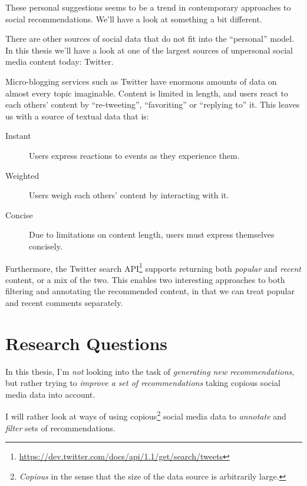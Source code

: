 These personal suggestions seems to be a trend in contemporary approaches to social recommendations.
We'll have a look at something a bit different.


There are other sources of social data that do not fit into the ``personal'' model.
In this thesis we'll have a look at one of the largest sources of unpersonal social media content today: Twitter.

Micro-blogging services such as Twitter have enormous amounts of data on almost every topic imaginable.
Content is limited in length, and users react to each others' content by ``re-tweeting'', ``favoriting'' or ``replying to'' it.
This leaves us with a source of textual data that is:

\begin{description}
  \item[Instant] Users express reactions to events as they experience them.
  \item[Weighted] Users weigh each others' content by interacting with it.
  \item[Concise] Due to limitations on content length, users must express themselves concisely.
\end{description}

Furthermore, the Twitter search API\footnote{\url{https://dev.twitter.com/docs/api/1.1/get/search/tweets}} supports returning both \emph{popular} and \emph{recent} content, or a mix of the two.
This enables two interesting approaches to both filtering and annotating the recommended content, in that we can treat popular and recent comments separately.


\section{Research Questions}

In this thesis, I'm \emph{not} looking into the task of \emph{generating new recommendations}, but rather trying to \emph{improve a set of recommendations} taking copious social media data into account.

I will rather look at ways of using copious\footnote{\emph{Copious} in the sense that the size of the data source is arbitrarily large.} social media data to \emph{annotate} and \emph{filter} sets of recommendations.

